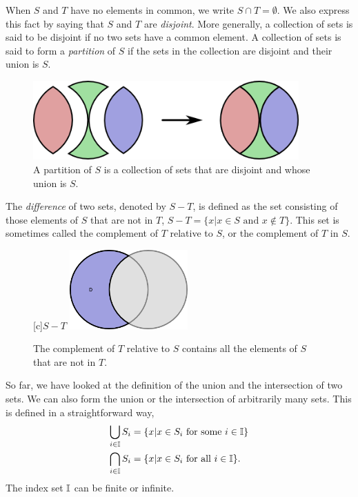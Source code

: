 When $S$ and $T$ have no elements in common, we write $S \cap T = \emptyset$.
We also express this fact by saying that $S$ and $T$ are \emph{disjoint}.
More generally, a collection of sets is said to be disjoint if no two sets have a common element.
A collection of sets is said to form a \emph{partition} of $S$ if the sets in the collection are disjoint and their union is $S$.

\begin{figure}[htb]
\begin{center}
\includegraphics[height=3.03cm]{Figures/1Chapter/setpartition}
\caption{A partition of $S$ is a collection of sets that are disjoint and whose union is $S$.}
\end{center}
\end{figure}

The \emph{difference} of two sets, denoted by $S - T$, is defined as the set consisting of those elements of $S$ that are not in $T$, $S - T = \{ x | x \in S \text{ and } x \notin T \}$.
This set is sometimes called the complement of $T$ relative to $S$, or the complement of $T$ in $S$.

\begin{figure}[htb]
\begin{center}
\begin{psfrags}
[c]{$S - T$}
\includegraphics[height=3.03cm]{Figures/1Chapter/difference}
\end{psfrags}
\caption{The complement of $T$ relative to $S$ contains all the elements of $S$ that are not in $T$.}
\end{center}
\end{figure}

So far, we have looked at the definition of the union and the intersection of two sets.
We can also form the union or the intersection of arbitrarily many sets.
This is defined in a straightforward way,
\begin{align*}
\bigcup_{i \in \mathbb{I}} S_{i}
&= \{ x | x \in S_{i} \text{ for some } i \in \mathbb{I} \} \\
\bigcap_{i \in \mathbb{I}} S_{i}
&= \{ x | x \in S_{i} \text{ for all } i \in \mathbb{I} \} .
\end{align*}
The index set $\mathbb{I}$ can be finite or infinite.


